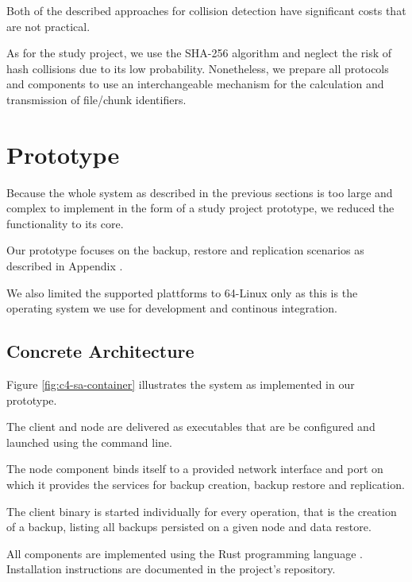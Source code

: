 Both of the described approaches for collision detection have significant costs that are not practical.

As for the study project, we use the SHA-256 algorithm\cite{sha-256} and neglect the risk of hash collisions due to its low probability. Nonetheless, we prepare all protocols and components to use an interchangeable mechanism for the calculation and transmission of file/chunk identifiers.

\section{Prototype}

Because the whole system as described in the previous sections is too large and complex to implement in the form of a study project prototype, we reduced the functionality to its core.

Our prototype focuses on the backup, restore and replication scenarios as described in Appendix .

We also limited the supported plattforms to 64-Linux only as this is the operating system we use for development and continous integration.

\subsection{Concrete Architecture}

Figure \ref{fig:c4-sa-container} illustrates the system as implemented in our prototype.

The \gls{client} and \gls{node} are delivered as executables that are be configured and launched using the command line.

The \gls{node} component binds itself to a provided network interface and port on which it provides the services for backup creation, backup restore and replication.

The \gls{client} binary is started individually for every operation, that is the creation of a backup, listing all backups persisted on a given \gls{node} and data restore.

All components are implemented using the Rust programming language \cite{rustlang-org}. Installation instructions are documented in the project's repository.


